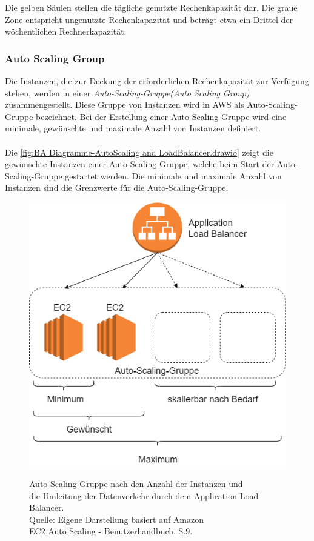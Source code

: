 Die gelben Säulen stellen die tägliche genutzte Rechenkapazität dar.
Die graue Zone entspricht ungenutzte Rechenkapazität und beträgt etwa ein Drittel der wöchentlichen Rechnerkapazität.
\subsubsection*{Auto Scaling Group}
Die Instanzen, die zur Deckung der erforderlichen Rechenkapazität zur Verfügung stehen, werden in einer \textit{Auto-Scaling-Gruppe(Auto Scaling Group)} zusammengestellt. Diese Gruppe von Instanzen wird in AWS als Auto-Scaling-Gruppe bezeichnet. Bei der Erstellung einer Auto-Scaling-Gruppe wird eine minimale, gewünschte und maximale Anzahl von Instanzen definiert. 
\\\\
Die \autoref{fig:BA Diagramme-AutoScaling and LoadBalancer.drawio} zeigt die gewünschte Instanzen einer Auto-Scaling-Gruppe, welche beim Start der Auto-Scaling-Gruppe gestartet werden. Die minimale und maximale Anzahl von Instanzen sind die Grenzwerte für die Auto-Scaling-Gruppe.  
\begin{figure}[h]
  \centering
  \includegraphics[scale=0.5]{sources/BA Diagramme-AutoScaling and LoadBalancer.drawio}
  \caption[Auto-Scaling-Gruppe nach den Anzahl der Instanzen und Umleitung der Datenverkehr durch dem Application Load Balancer]{}
  \label{fig:BA Diagramme-AutoScaling and LoadBalancer.drawio} 
  Auto-Scaling-Gruppe nach den Anzahl der Instanzen und\\ die Umleitung der Datenverkehr durch dem Application Load Balancer.\\
  Quelle: Eigene Darstellung %
  basiert auf Amazon \\
  EC2 Auto Scaling - Benutzerhandbuch. S.9\cite{AMZ31}.
\end{figure}
